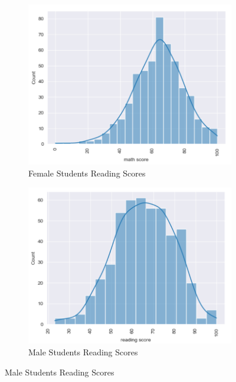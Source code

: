 \documentclass[doc]{apa6} %
\begin{document}
\begin{figure}[H]
    \centering
    \caption{Reading Standardized Scores by Gender}
    \begin{subfigure}[b]{0.45\textwidth}
        \includegraphics[width=\linewidth]{FemaleStudentsMathScoreCurve.png}
        \caption{Female Students Reading Scores}
        \label{fig:FemaleRead}
    \end{subfigure}
    \begin{subfigure}[b]{0.45\textwidth}
        \includegraphics[width=\linewidth]{MaleStudentReadingScoreCurve.png}
        \caption{Male Students Reading Scores}
        \label{fig:MaleRead}
    \end{subfigure}
    \label{fig:FemaleMaleGraphsR}
\end{figure}
\end{document}
